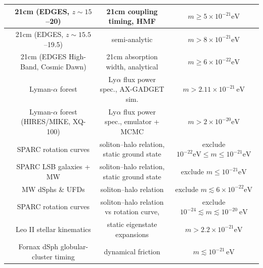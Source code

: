 \begin{table}[!htbp]
{\begin{tabular}{|c|c|c|c|}
            \hline \cite{lidz2018implications}           & 21cm (EDGES, $z\sim15$--20)                           & 21cm coupling timing, HMF                     & $m \geq 5 \times 10^{-21}\mathrm{eV}$ \\
            \hline \cite{schneider2018constraining}      & 21cm (EDGES, $z\sim15.5$--19.5)                       & semi-analytic                                 & $m>8\times10^{-21}\mathrm{eV}$ \\
            \hline \cite{nebrin2019fuzzy}                & 21cm (EDGES High-Band, Cosmic Dawn)                   & 21cm absorption width, analytical             & $m \geq 6 \times 10^{-22}\mathrm{eV}$ \\
            \hline \cite{nori2019lyman}                  & Lyman-$\alpha$ forest                                 & Ly$\alpha$ flux power spec., AX-GADGET sim.   & $m>2.11\times10^{-21}\,\mathrm{eV}$ \\
            \hline \cite{rogers2021strong}               & Lyman-$\alpha$ forest (HIRES/MIKE, XQ-100)            & Ly$\alpha$ flux power spec., emulator + MCMC  & $m>2\times10^{-20}\mathrm{eV}$ \\
            \hline
            \hline \cite{bar2018galactic}                & SPARC rotation curves                                 & soliton--halo relation, static ground state   & exclude $10^{-22} \mathrm{eV}\leq m \leq 10^{-21} \mathrm{eV}$ \\
            \hline \cite{bar2019ultralight}              & SPARC LSB galaxies + MW                               & soliton--halo relation, static ground state   & exclude $m \leq 10^{-21} \mathrm{eV}$ \\
            \hline \cite{safarzadeh2020ultralight}       & MW dSphs \& UFDs                                      & soliton--halo relation                        & exclude $m \lesssim 6 \times 10^{-22}\mathrm{eV}$ \\
            \hline \cite{bar2022galactic}                & SPARC rotation curves                                 & soliton--halo relation vs rotation curve,     & exclude $10^{-24} \lesssim m \lesssim 10^{-20}\ \mathrm{eV}$ \\
            \hline \cite{zimmermann2025dwarf}            & Leo II stellar kinematics                             & static eigenstate expansions                  & $m>2.2\times10^{-21}\mathrm{eV}$ \\
            \hline
            \hline \cite{lancaster2020dynamical}         & Fornax dSph globular-cluster timing                   & dynamical friction                            & $m\lesssim 10^{-21}\,\mathrm{eV}$ \\

\end{tabular}}
\end{table}
